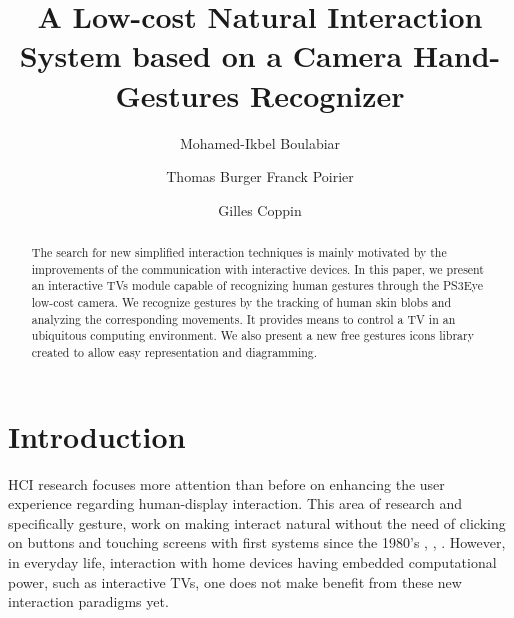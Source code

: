 \documentclass{llncs}
\begin{document}
\frontmatter          %
\pagestyle{headings}  %
\mainmatter              %
%
\title{A Low-cost Natural Interaction System based on a Camera Hand-Gestures Recognizer}
\author{Mohamed-Ikbel Boulabiar \and Thomas Burger
Franck Poirier \and Gilles Coppin}
%

\maketitle

\begin{abstract}
The search for new simplified interaction techniques is 
mainly motivated by the improvements of 
the communication with interactive devices.
In this paper, we present an interactive TVs module capable
of recognizing human gestures through the PS3Eye low-cost camera.
We recognize gestures by the tracking of human skin blobs and analyzing the 
corresponding movements. It provides means to control a TV in an ubiquitous
computing environment.
We also present a new free gestures icons library created to allow easy
representation and diagramming.

\end{abstract}
%

\section{Introduction}
HCI research focuses more attention than before on enhancing the user
experience regarding human-display interaction.
This area of research and specifically gesture, work on making interact natural
without the need of clicking on buttons and touching screens with first systems
since the 1980's \cite{Bolt1980}, \cite{Pavlovic97visinter}, \cite{Derpanisreview}.
However, in everyday life, interaction with home devices having
embedded computational power, such as interactive TVs,
one does not make benefit from these new interaction paradigms yet. 
\end{document}
